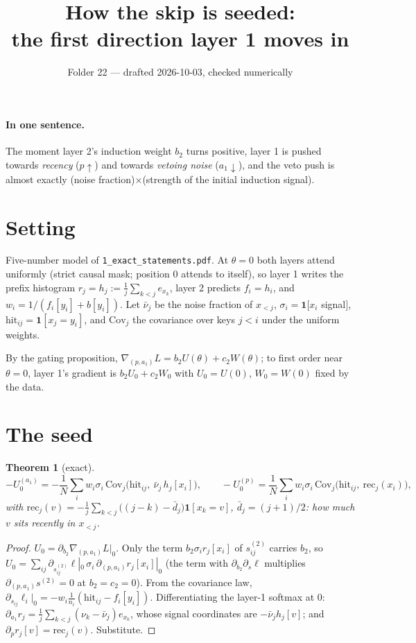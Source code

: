 \documentclass[11pt]{article}
\title{How the skip is seeded:\\ the first direction layer 1 moves in}
\author{Folder 22 --- drafted 2026-10-03, checked numerically}
\date{}
\newtheorem{theorem}{Theorem}\newtheorem{corollary}{Corollary}
\theoremstyle{remark}\newtheorem{remark}{Remark}
\newcommand{\1}{\mathbf{1}}
\begin{document}
\maketitle

\paragraph{In one sentence.} The moment layer 2's induction weight $b_2$ turns positive, layer 1
is pushed towards \emph{recency} ($p\uparrow$) and towards \emph{vetoing noise} ($a_1\downarrow$),
and the veto push is almost exactly (noise fraction)$\times$(strength of the initial induction
signal).

\section{Setting}
Five-number model of \texttt{1\_exact\_statements.pdf}. At $\theta=0$ both layers attend uniformly (strict causal
mask; position 0 attends to itself), so layer 1 writes the prefix histogram
$r_j=h_j:=\frac1j\sum_{k<j}e_{x_k}$, layer 2 predicts $f_i=h_i$, and
$w_i=1/(f_i[y_i]+b[y_i])$. Let $\bar\nu_j$ be the noise fraction of $x_{<j}$, $\sigma_i=\1[x_i$ signal$]$,
$\mathrm{hit}_{ij}=\1[x_j=y_i]$, and $\mathrm{Cov}_j$ the covariance over keys $j<i$ under the
uniform weights.

By the gating proposition, $\nabla_{(p,a_1)}L=b_2U(\theta)+c_2W(\theta)$; to first order near
$\theta=0$, layer 1's gradient is $b_2U_0+c_2W_0$ with $U_0=U(0)$, $W_0=W(0)$ fixed by the data.

\section{The seed}
\begin{theorem}[exact]
\[
-U_0^{(a_1)}=-\frac1N\sum_i w_i\sigma_i\,\mathrm{Cov}_j\big(\mathrm{hit}_{ij},\ \bar\nu_j\,h_j[x_i]\big),
\qquad
-U_0^{(p)}=\frac1N\sum_i w_i\sigma_i\,\mathrm{Cov}_j\big(\mathrm{hit}_{ij},\ \mathrm{rec}_j(x_i)\big),
\]
with $\mathrm{rec}_j(v)=-\frac1j\sum_{k<j}\big((j-k)-\bar d_j\big)\1[x_k=v]$, $\bar d_j=(j+1)/2$:
how much $v$ sits \emph{recently} in $x_{<j}$.
\end{theorem}
\begin{proof}
$U_0=\partial_{b_2}\nabla_{(p,a_1)}L|_0$. Only the term $b_2\sigma_ir_j[x_i]$ of $s^{(2)}_{ij}$ carries
$b_2$, so $U_0=\sum_{ij}\partial_{s^{(2)}_{ij}}\ell|_0\,\sigma_i\,\partial_{(p,a_1)}r_j[x_i]|_0$
(the term with $\partial_{b_2}\partial_s\ell$ multiplies $\partial_{(p,a_1)}s^{(2)}=0$ at $b_2=c_2=0$).
From the covariance law, $\partial_{s_{ij}}\ell_i|_0=-w_i\frac1{n_i}(\mathrm{hit}_{ij}-f_i[y_i])$.
Differentiating the layer-1 softmax at $0$:
$\partial_{a_1}r_j=\frac1j\sum_{k<j}(\nu_k-\bar\nu_j)e_{x_k}$, whose signal coordinates are
$-\bar\nu_j h_j[v]$; and $\partial_pr_j[v]=\mathrm{rec}_j(v)$. Substitute.
\end{proof}
\end{document}
